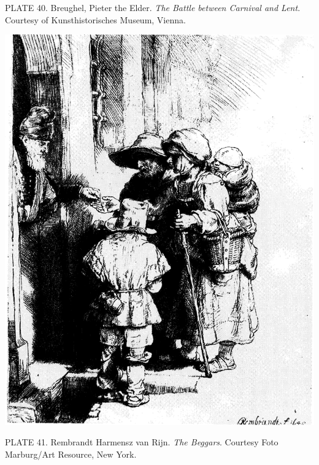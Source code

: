 PLATE 40. Breughel, Pieter the Elder. \emph{The Battle between Carnival
and Lent}. Courtesy of Kunsthistorisches Museum, Vienna.

\protect\hypertarget{20_ILLUSTRATIONS_FOLLOW_PAGE.xhtmlux5cux23id_36}{}{}\includegraphics{include/html/images/356_1.png}

PLATE 41. Rembrandt Harmensz van Rijn. \emph{The Beggars}. Courtesy Foto
Marburg/Art Resource, New York.

